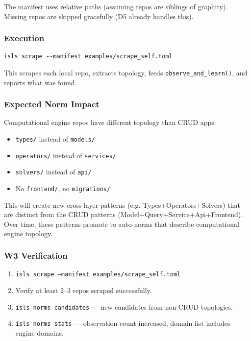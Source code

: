 \documentclass[11pt,a4paper]{article}
\begin{document}
The manifest uses relative paths (assuming repos are siblings of 
graphity). Missing repos are skipped gracefully (D5 already handles 
this).

\subsubsection{Execution}

\begin{lstlisting}[style=bash]
isls scrape --manifest examples/scrape_self.toml
\end{lstlisting}

This scrapes each local repo, extracts topology, feeds 
\texttt{observe\_and\_learn()}, and reports what was found.

\subsubsection{Expected Norm Impact}

Computational engine repos have different topology than CRUD apps:
\begin{itemize}[nosep]
\item \texttt{types/} instead of \texttt{models/}
\item \texttt{operators/} instead of \texttt{services/}
\item \texttt{solvers/} instead of \texttt{api/}
\item No \texttt{frontend/}, no \texttt{migrations/}
\end{itemize}

This will create new cross-layer patterns (e.g. 
Types+Operators+Solvers) that are distinct from the CRUD patterns 
(Model+Query+Service+Api+Frontend). Over time, these patterns 
promote to auto-norms that describe computational engine topology.

\subsubsection{W3 Verification}

\begin{enumerate}[nosep]
\item \texttt{isls scrape --manifest examples/scrape\_self.toml}
\item Verify at least 2--3 repos scraped successfully.
\item \texttt{isls norms candidates} --- new candidates from 
      non-CRUD topologies.
\item \texttt{isls norms stats} --- observation count increased, 
      domain list includes engine domains.
\end{enumerate}
\end{document}
